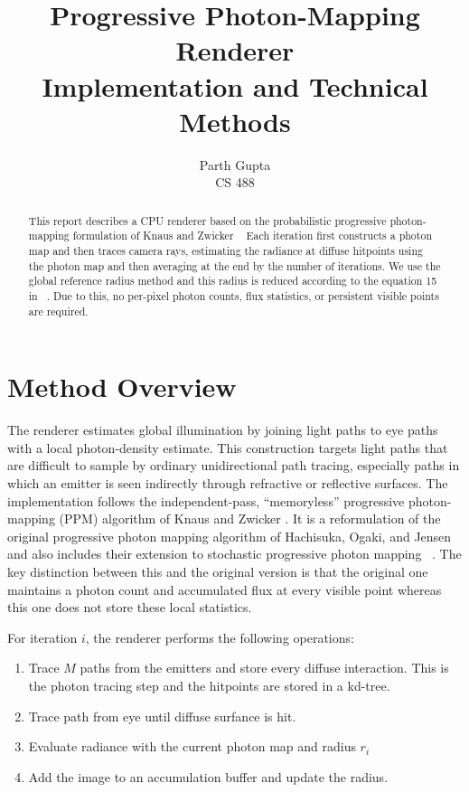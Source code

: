 \documentclass[10pt,twocolumn]{article}
\title{\vspace{-1.5em}\textbf{Progressive Photon-Mapping Renderer}\\
\large Implementation and Technical Methods\vspace{-0.4em}}
\author{Parth Gupta\\CS 488}
\date{}
\begin{document}
\maketitle
\vspace{-1.4em}

\begin{abstract}
This report describes a CPU renderer based on the probabilistic progressive
photon-mapping formulation of Knaus and Zwicker ~\cite{knaus2011}  Each iteration first constructs a photon map and then traces camera rays, estimating the radiance at diffuse hitpoints using the photon map and then averaging at the end by the number of iterations. We use the global reference radius method and this radius is reduced according to the equation 15 in ~\cite{knaus2011}. Due to this, no
per-pixel photon counts, flux statistics, or persistent visible points are required.
\end{abstract}

\section{Method Overview}

The renderer estimates global illumination by joining light paths to eye
paths with a local photon-density estimate.  This construction targets light
paths that are difficult to sample by ordinary unidirectional path tracing,
especially paths in which an emitter is seen indirectly through refractive or
reflective surfaces.  The implementation follows the independent-pass,
``memoryless'' progressive photon-mapping (PPM) algorithm of Knaus and Zwicker
\cite{knaus2011}. It is a reformulation of the original progressive photon mapping algorithm of Hachisuka, Ogaki, and Jensen ~\cite{hachisuka2008progressive} and also includes their extension to stochastic progressive photon mapping ~\cite{hachisuka2009stochastic}. The key distinction between this and the original version is that the original one maintains a photon count and accumulated flux at every visible point whereas this one does not store these local statistics.

For iteration $i$, the renderer performs the following operations:

\begin{enumerate}
  \item Trace $M$ paths from the emitters and store every diffuse interaction. This is the photon tracing step and the hitpoints are stored in a kd-tree. 
  \item Trace path from eye until diffuse surfance is hit.
  \item Evaluate radiance with the current
        photon map and radius $r_i$
  \item Add the image to an accumulation buffer and update the radius.
\end{enumerate}
\end{document}
